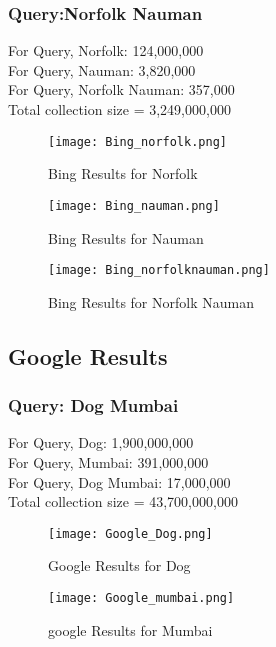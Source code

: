 \documentclass[12pt]{report}
\begin{document}
\subsubsection{Query:Norfolk Nauman}
For Query, Norfolk: 124,000,000\\
For Query, Nauman: 3,820,000\\
For Query, Norfolk Nauman: 357,000\\

Total collection size = 3,249,000,000\\

\begin{figure}[ht] 
  \centering
  \texttt{[image: Bing\_norfolk.png]}
  \caption{Bing Results for Norfolk}
  \label{fig:4}
\end{figure}

\begin{figure}[ht] 
  \centering
  \texttt{[image: Bing\_nauman.png]}
  \caption{Bing Results for Nauman}
  \label{fig:5}
\end{figure}

\begin{figure}[ht] 
  \centering
  \texttt{[image: Bing\_norfolknauman.png]}
  \caption{Bing Results for Norfolk Nauman}
  \label{fig:6}
\end{figure}

\subsection{Google Results}
\subsubsection{Query: Dog Mumbai}
For Query, Dog: 1,900,000,000\\
For Query, Mumbai: 391,000,000\\
For Query, Dog Mumbai: 17,000,000\\

Total collection size = 43,700,000,000

\begin{figure}[ht] 
  \centering
  \texttt{[image: Google\_Dog.png]}
  \caption{Google Results for Dog}
  \label{fig:7}
\end{figure}

\begin{figure}[ht] 
  \centering
  \texttt{[image: Google\_mumbai.png]}
  \caption{google Results for Mumbai}
  \label{fig:8}
\end{figure}
\end{document}
